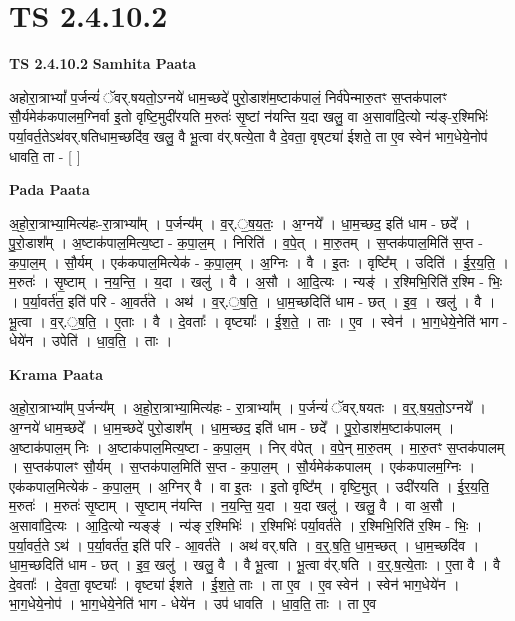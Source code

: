 \documentclass[17pt]{extarticle}
\begin{document}
\section*{ TS 2.4.10.2 }

\textbf{TS 2.4.10.2 } \newline
\textbf{Samhita Paata} \newline

अहोरा॒त्राभ्यां᳚ प॒र्जन्यं॑ ॅवर्.षयतो॒ऽग्नये॑ धाम॒च्छदे॑ पुरो॒डाश॑म॒ष्टाक॑पालं॒ निर्व॑पेन्मारु॒तꣳ स॒प्तक॑पालꣳ सौ॒र्यमेक॑कपालम॒ग्निर्वा इ॒तो वृष्टि॒मुदी॑रयति म॒रुतः॑ सृ॒ष्टां न॑यन्ति य॒दा खलु॒ वा अ॒सावा॑दि॒त्यो न्य॑ङ्-र॒श्मिभिः॑ पर्या॒वर्त॒तेऽथ॑वर्.षतिधाम॒च्छदि॑व॒ खलु॒ वै भू॒त्वा व॑र्.षत्ये॒ता वै दे॒वता॒ वृष्‌ट्या॑ ईशते॒ ता ए॒व स्वेन॑ भाग॒धेये॒नोप॑ धावति॒ ता - [  ] \newline

\textbf{Pada Paata} \newline

अ॒हो॒रा॒त्राभ्या॒मित्य॑हः-रा॒त्राभ्या᳚म् ।  प॒र्जन्य᳚म् । व॒र्.॒ष॒य॒तः॒ । अ॒ग्नये᳚ । धा॒म॒च्छद॒ इति॑ धाम - छदे᳚ । पु॒रो॒डाश᳚म् । अ॒ष्टाक॑पाल॒मित्य॒ष्टा - क॒पा॒ल॒म् । निरिति॑ । व॒पे॒त् । मा॒रु॒तम् । स॒प्तक॑पाल॒मिति॑ स॒प्त - क॒पा॒ल॒म् । सौ॒र्यम् । एक॑कपाल॒मित्येक॑ - क॒पा॒ल॒म् । अ॒ग्निः । वै । इ॒तः । वृष्टि᳚म् । उदिति॑ । ई॒र॒य॒ति॒ । म॒रुतः॑ । सृ॒ष्टाम् । न॒य॒न्ति॒ । य॒दा । खलु॑ । वै । अ॒सौ । आ॒दि॒त्यः । न्यङ्॑ । र॒श्मिभि॒रिति॑ र॒श्मि - भिः॒ । प॒र्या॒वर्त॑त॒ इति॑ परि - आ॒वर्त॑ते । अथ॑ । व॒र्.॒ष॒ति॒ । धा॒म॒च्छदिति॑ धाम - छत् । इ॒व॒ । खलु॑ । वै । भू॒त्वा ।   व॒र्.॒ष॒ति॒ । ए॒ताः । वै । दे॒वताः᳚ । वृष्ट्याः᳚ । ई॒श॒ते॒ । ताः । ए॒व । स्वेन॑ । भा॒ग॒धेये॒नेति॑ भाग - धेये॑न । उपेति॑ । धा॒व॒ति॒ । ताः ।  \newline


\textbf{Krama Paata} \newline

अ॒हो॒रा॒त्राभ्या᳚म् प॒र्जन्य᳚म् । अ॒हो॒रा॒त्राभ्या॒मित्य॑हः - रा॒त्राभ्या᳚म् । प॒र्जन्यं॑ ॅवर्.षयतः । व॒र्॒.ष॒य॒तो॒ऽग्नये᳚ । अ॒ग्नये॑ धाम॒च्छदे᳚ । धा॒म॒च्छदे॑ पुरो॒डाश᳚म् । धा॒म॒च्छद॒ इति॑ धाम - छदे᳚ । पु॒रो॒डाश॑म॒ष्टाक॑पालम् । अ॒ष्टाक॑पाल॒म् निः । अ॒ष्टाक॑पाल॒मित्य॒ष्टा - क॒पा॒ल॒म् । निर् व॑पेत् । व॒पे॒न् मा॒रु॒तम् । मा॒रु॒तꣳ स॒प्तक॑पालम् । स॒प्तक॑पालꣳ सौ॒र्यम् । स॒प्तक॑पाल॒मिति॑ स॒प्त - क॒पा॒ल॒म् । सौ॒र्यमेक॑कपालम् । एक॑कपालम॒ग्निः । एक॑कपाल॒मित्येक॑ - क॒पा॒ल॒म् । अ॒ग्निर् वै । वा इ॒तः । इ॒तो वृष्टि᳚म् । वृष्टि॒मुत् । उदी॑रयति । ई॒र॒य॒ति॒ म॒रुतः॑ । म॒रुतः॑ सृ॒ष्टाम् । सृ॒ष्टाम् न॑यन्ति । न॒य॒न्ति॒ य॒दा । य॒दा खलु॑ । खलु॒ वै । वा अ॒सौ । अ॒सावा॑दि॒त्यः । आ॒दि॒त्यो न्यङ्ङ्॑ । न्य॑ङ् र॒श्मिभिः॑ । र॒श्मिभिः॑ पर्या॒वर्त॑ते । र॒श्मिभि॒रिति॑ र॒श्मि - भिः॒ । प॒र्या॒वर्त॒ते ऽथ॑ । प॒र्या॒वर्त॑त॒ इति॑ परि - आ॒वर्त॑ते । अथ॑ वर्.षति । व॒र्॒.ष॒ति॒ धा॒म॒च्छत् । धा॒म॒च्छदि॑व । धा॒म॒च्छदिति॑ धाम - छत् । इ॒व॒ खलु॑ । खलु॒ वै । वै भू॒त्वा । भू॒त्वा व॑र्.षति । व॒र्॒.ष॒त्ये॒ताः । ए॒ता वै । वै दे॒वताः᳚ । दे॒वता॒ वृष्ट्याः᳚ । वृष्ट्या॑ ईशते । ई॒श॒ते॒ ताः । ता ए॒व । ए॒व स्वेन॑ । स्वेन॑ भाग॒धेये॑न । भा॒ग॒धेये॒नोप॑ । भा॒ग॒धेये॒नेति॑ भाग - धेये॑न । उप॑ धावति । धा॒व॒ति॒ ताः । ता ए॒व \newline
\end{document}
